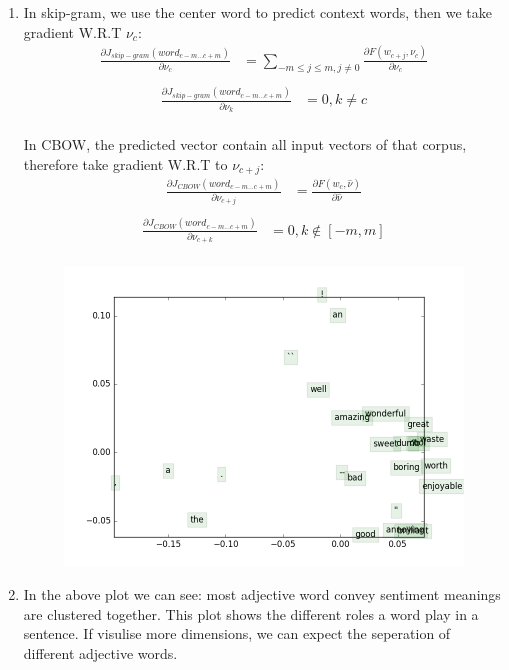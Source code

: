 \documentclass[10pt]{article}
\begin{document}
\begin{enumerate}[label=(\alph*)]
\item
In skip-gram, we use the center word to predict context words, then we take gradient W.R.T $\nu_c$:
\begin{equation*}
\begin{aligned}
	\frac{\partial J_{skip-gram}(word_{c-m...c+m})}{\partial \nu_{c}} & = \sum_{-m\le j\le m, j\neq0} \frac{\partial F(w_{c+j}, \nu_c)}{\partial \nu_{c}}\\
\end{aligned}
\end{equation*}
\begin{equation*}
\begin{aligned}
	\frac{\partial J_{skip-gram}(word_{c-m...c+m})}{\partial \nu_{k}} & = 0, k\neq c\\
\end{aligned}
\end{equation*}

In CBOW, the predicted vector contain all input vectors of that corpus, therefore take gradient W.R.T to $\nu_{c+j}$:
\begin{equation*}
\begin{aligned}
	\frac{\partial J_{CBOW}(word_{c-m...c+m})}{\partial \nu_{c+j}} & = \frac{\partial F(w_{c}, \hat{\nu})}{\partial \hat{\nu}}\\
\end{aligned}
\end{equation*}
\begin{equation*}
\begin{aligned}
	\frac{\partial J_{CBOW}(word_{c-m...c+m})}{\partial \nu_{c+k}} & = 0, k\notin[-m, m]\\
\end{aligned}
\end{equation*}

\begin{figure}[h]
\center
\includegraphics[scale=0.5]{q3_word_vectors.png}
\end{figure}
\item
In the above plot we can see: most adjective word convey sentiment meanings are clustered together.
This plot shows the different roles a word play in a sentence.
If visulise more dimensions, we can expect the seperation of different adjective words.



\end{enumerate}
\end{document}

